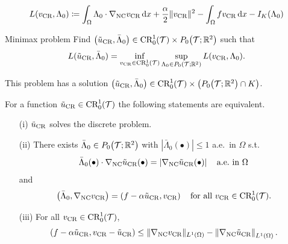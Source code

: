 \begin{frame}
  $$L(v_\textup{CR},\Lambda_0) \coloneqq \int_\Omega\Lambda_0\cdot\nabla_\textup{NC}v_\textup{CR}\,\mathrm{d}x +
  \frac{\alpha}{2}\Vert v_\textup{CR}\Vert^2 -\int_\Omega fv_\textup{CR}\,\mathrm{d}x
  - I_K(\Lambda_0)$$

  \begin{block}{Minimax problem}
    Find $\left( \tilde{u}_{\textup{CR}},\bar\Lambda_0 \right)\in\textup{CR}^1_0(\mathcal{T})\times
    P_0\!\left(\mathcal{T};\mathbb{R}^2\right)$ such that
    \begin{align*}
      L(\tilde{u}_{\textup{CR}},\bar\Lambda_0) 
      = 
      \inf_{v_\textup{CR}\in\textup{CR}^1_0(\mathcal{T})}\sup_{\Lambda_0\in P_0\left(\mathcal{T};\mathbb{R}^2\right)}
      L(v_\textup{CR},\Lambda_0).
    \end{align*}
  \end{block}
  
  \pause
  \medskip

  This problem has a solution $\left( \tilde{u}_{\textup{CR}},\bar\Lambda_0
  \right)\in\textup{CR}^1_0(\mathcal{T})\times \left(P_0\!\left(\mathcal{T};\mathbb{R}^2\right)\cap
  K\right)$.

  \pause
  \medskip

\end{frame}

\begin{frame}
  \begin{theorem}
    For a function $\tilde{u}_{\textup{CR}}\in\textup{CR}^1_0(\mathcal{T})$ the following statements
    are equivalent.
    \begin{itemize}
      \item[(i)] $\tilde{u}_{\textup{CR}}$ solves the discrete problem.
      \item[(ii)] There exists
        $\bar\Lambda_0\in P_0\!\left(\mathcal{T};\mathbb{R}^2\right)$ with
        $\left|\bar\Lambda_0(\bullet)\right|\leq 1$
        a.e.\ in $\Omega$ s.t.
        \begin{equation*}
          \bar\Lambda_0(\bullet)\cdot\nabla_\textup{NC}\tilde{u}_{\textup{CR}}(\bullet)
          =
          \left|\nabla_\textup{NC}\tilde{u}_{\textup{CR}}(\bullet)\right| 
          \quad\text{a.e.\ in } \Omega 
        \end{equation*}
        and
        \begin{equation*}
          \left(\bar\Lambda_0,\nabla_\textup{NC}v_\textup{CR}\right)
          = \left(f-\alpha\tilde{u}_{\textup{CR}},
          v_\textup{CR}\right)
          \quad\text{for all } v_\textup{CR}\in\textup{CR}^1_0(\mathcal{T}).
        \end{equation*}
      \item[(iii)] For all $v_\textup{CR}\in\textup{CR}^1_0(\mathcal{T})$,
        \begin{equation*}
          \left(f-\alpha\tilde{u}_{\textup{CR}},v_\textup{CR}-\tilde{u}_{\textup{CR}}\right)\leq
          \Vert\nabla_\textup{NC}v_\textup{CR}\Vert_{L^1(\Omega)} -
          \left\Vert\nabla_\textup{NC}\tilde{u}_{\textup{CR}}\right\Vert_{L^1(\Omega)}.
        \end{equation*}
    \end{itemize}
  \end{theorem}
\end{frame}
